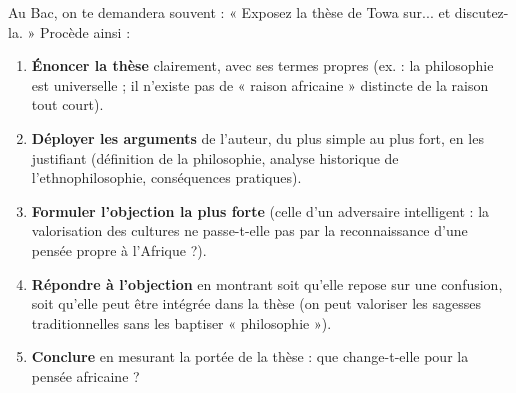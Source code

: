 \documentclass[11pt]{article}
\begin{document}
\begin{methode}
Au Bac, on te demandera souvent : « Exposez la thèse de Towa sur... et discutez-la. » Procède ainsi :
\begin{enumerate}
\item \textbf{Énoncer la thèse} clairement, avec ses termes propres (ex. : la philosophie est universelle ; il n'existe pas de « raison africaine » distincte de la raison tout court).
\item \textbf{Déployer les arguments} de l'auteur, du plus simple au plus fort, en les justifiant (définition de la philosophie, analyse historique de l'ethnophilosophie, conséquences pratiques).
\item \textbf{Formuler l'objection la plus forte} (celle d'un adversaire intelligent : la valorisation des cultures ne passe-t-elle pas par la reconnaissance d'une pensée propre à l'Afrique ?).
\item \textbf{Répondre à l'objection} en montrant soit qu'elle repose sur une confusion, soit qu'elle peut être intégrée dans la thèse (on peut valoriser les sagesses traditionnelles sans les baptiser « philosophie »).
\item \textbf{Conclure} en mesurant la portée de la thèse : que change-t-elle pour la pensée africaine ?
\end{enumerate}
\end{methode}
\end{document}
